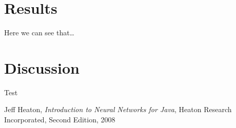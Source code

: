 \documentclass{article}
\begin{document}
\section{Results}
Here we can see that\ldots

\section{Discussion}
Test

\begin{thebibliography}{1}

    Jeff Heaton,
    \emph{Introduction to Neural Networks for Java},
    Heaton Research Incorporated,
    Second Edition,
    2008

\end{thebibliography}
\end{document}
